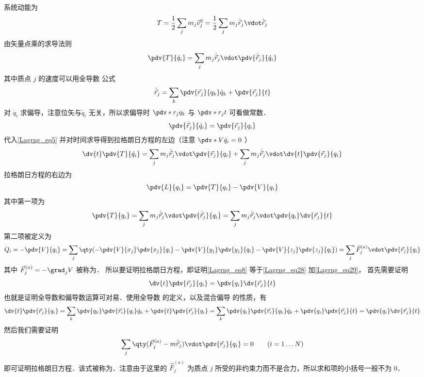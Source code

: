 系统动能为
\begin{equation}
T = \frac12 \sum_j m_j \vec v_j^2 = \frac12 \sum_j m_j \dot{\vec r}_j \vdot \dot{\vec r}_j
\end{equation}
由矢量点乘的求导法则
\begin{equation}\label{Lagrng_eq5}
\pdv{T}{\dot q_i} = \sum_j m_j \dot{\vec r}_j \vdot \pdv{\dot{\vec r}_j}{\dot q_i}
\end{equation}
其中质点 $j$ 的速度可以用全导数 公式
\begin{equation}
\dot{\vec r}_j = \sum_k \pdv{\vec r_j}{q_k} \dot q_k  + \pdv{\vec r_j}{t}
\end{equation}
对 $\dot q_i$ 求偏导，注意位矢与$\dot q_i$ 无关，所以求偏导时 $\pdv*{r_j}{q_k}$ 与 $\pdv*{r_j}{t}$ 可看做常数．
\begin{equation}\label{Lagrng_eq27}
\pdv{\dot{\vec r}_j}{\dot q_i} = \pdv{\vec r_j}{q_i}
\end{equation}
代入\autoref{Lagrng_eq5} 并对时间求导得到拉格朗日方程的左边（注意 $\pdv*{V}{\dot q_i} = 0$ ）
\begin{equation}\label{Lagrng_eq8}
\dv{t} \pdv{T}{\dot q_i} = \sum_j m_j \ddot{\vec r}_j \vdot \pdv{\vec r_j}{q_i}  + \sum_j m_j \dot{\vec r}_j \vdot \dv{t} \pdv{\vec r_j}{q_i}
\end{equation}
拉格朗日方程的右边为
\begin{equation}\label{Lagrng_eq9}
\pdv{L}{q_i} = \pdv{T}{q_i} - \pdv{V}{q_i}
\end{equation}
其中第一项为
\begin{equation}\label{Lagrng_eq28}
\pdv{T}{q_i} = \sum_j m_j \dot{\vec r}_j \vdot \pdv{\dot{\vec r}_j}{q_i} = \sum_j m_j \dot{\vec r}_j \vdot \pdv{q_i} \dv{\vec r_j}{t}
\end{equation}
第二项被定义为
\begin{equation}\label{Lagrng_eq29}
Q_i = - \pdv{V}{q_i} = \sum_j \qty(-\pdv{V}{x_j} \pdv{x_j}{q_i} - \pdv{V}{y_j}\pdv{y_j}{q_i} - \pdv{V}{z_j} \pdv{z_j}{q_i}) = \sum_j \vec F_j^{(a)} \vdot \pdv{\vec r_j}{q_i}
\end{equation}
其中 $\vec F_j^{(a)} = - \grad_j V$ 被称为．%
所以要证明拉格朗日方程，即证明\autoref{Lagrng_eq8} 等于\autoref{Lagrng_eq28} 加\autoref{Lagrng_eq29}， 首先需要证明
\begin{equation}
\dv{t} \pdv{\vec r_j}{q_i} = \pdv{q_i} \dv{\vec r_j}{t}
\end{equation}
也就是证明全导数和偏导数运算可对易．使用全导数 的定义，以及混合偏导 的性质，有
\begin{equation}
\dv{t} \pdv{\vec r_j}{q_i} = \sum_k \pdv{q_k} \pdv{\vec r_i}{q_i} \dot q_k  + \pdv{t} \pdv{\vec r_j}{q_i} = \sum_k \pdv{q_i} \pdv{\vec r_i}{q_k} \dot q_k + \pdv{q_i} \pdv{\vec r_j}{t} = \pdv{q_i} \dv{\vec r_j}{t}
\end{equation}
然后我们需要证明
\begin{equation}
\sum_j \qty(\vec F_j^{(a)} - m\ddot{\vec r}_j) \vdot \pdv{\vec r_j}{q_i}  = 0
\qquad (i = 1\dots N)
\end{equation}
即可证明拉格朗日方程．该式被称为．注意由于这里的 $\vec F_j^{(a)}$ 为质点 $j$ 所受的非约束力而不是合力，所以求和项的小括号一般不为 0．

